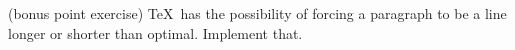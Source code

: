 (bonus point exercise)
\TeX\ has the possibility of forcing a paragraph to be a line longer
or shorter than optimal. Implement that.
